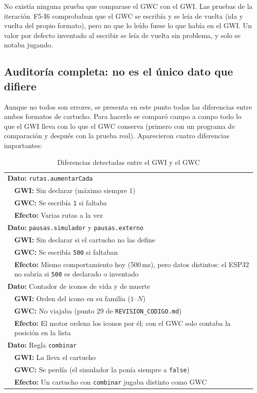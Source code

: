 No existía ninguna prueba que comparase el GWC con el GWI. Las pruebas de la iteración~F5-I6 comprobaban que el GWC se escribía y se leía de vuelta (ida y vuelta del propio formato), pero no que lo leído fuese lo que había en el GWI. Un valor por defecto inventado al escribir se leía de vuelta sin problema, y solo se notaba jugando.

\subsection{Auditoría completa: no es el único dato que difiere}
\label{sec:F5I13Auditoria}

Aunque no todos son errores, se presenta en este punto todas las diferencias entre ambos formatos de cartucho. Para hacerlo se comparó campo a campo todo lo que el GWI lleva con lo que el GWC conserva (primero con un programa de comparación y después con la prueba real). Aparecieron cuatro diferencias importantes:

\begin{table}[htbp]
	\centering
	\begin{tabularx}{\textwidth}{p{0.8cm} >{\RaggedRight\arraybackslash}X}
		\toprule
		\multicolumn{2}{l}{\textbf{Dato:} \texttt{rutas.aumentarCada}} \\
		& \textbf{GWI:} Sin declarar (máximo siempre 1) \\
		& \textbf{GWC:} Se escribía \texttt{1} si faltaba \\
		& \textbf{Efecto:} Varias rutas a la vez \\
		\midrule
		\multicolumn{2}{l}{\textbf{Dato:} \texttt{pausas.simulador} y \texttt{pausas.externo}} \\
		& \textbf{GWI:} Sin declarar si el cartucho no las define \\
		& \textbf{GWC:} Se escribía \texttt{500} si faltaban \\
		& \textbf{Efecto:} Mismo comportamiento hoy (500\,ms), pero datos distintos: el ESP32 no sabría si \texttt{500} es declarado o inventado \\
		\midrule
		\multicolumn{2}{l}{\textbf{Dato:} Contador de iconos de vida y de muerte} \\
		& \textbf{GWI:} Orden del icono en su familia ($1\text{--}N$) \\
		& \textbf{GWC:} No viajaba (punto 29 de \texttt{REVISION\_CODIGO.md}) \\
		& \textbf{Efecto:} El motor ordena los iconos por él; con el GWC solo contaba la posición en la lista \\
		\midrule
		\multicolumn{2}{l}{\textbf{Dato:} Regla \texttt{combinar}} \\
		& \textbf{GWI:} La lleva el cartucho \\
		& \textbf{GWC:} Se perdía (el simulador la ponía siempre a \texttt{false}) \\
		& \textbf{Efecto:} Un cartucho con \texttt{combinar} jugaba distinto como GWC \\
		\bottomrule
	\end{tabularx}
	\caption{Diferencias detectadas entre el GWI y el GWC}
	\label{tab:gwi-gwc-f5-i13}
\end{table}

